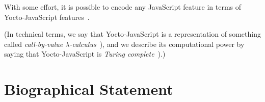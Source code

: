 \documentclass[12pt, oneside]{book}
\begin{document}
With some effort, it is possible to encode any JavaScript feature in terms of Yocto-JavaScript features~\cite[§~6]{understanding-computation}.

(In technical terms, we say that Yocto-JavaScript is a representation of something called \emph{call-by-value \(\lambda\)-calculus}~\cite[§~6]{understanding-computation}), and we describe its computational power by saying that Yocto-JavaScript is \emph{Turing complete}~\cite[§~7]{understanding-computation}).)


\appendix


\backmatter




\chapter{Biographical Statement}

\end{document}
